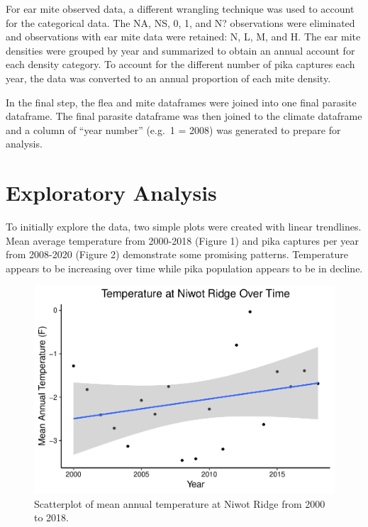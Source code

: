 \documentclass[
  12pt,
]{article}
\begin{document}
For ear mite observed data, a different wrangling technique was used to
account for the categorical data. The NA, NS, 0, 1, and N? observations
were eliminated and observations with ear mite data were retained: N, L,
M, and H. The ear mite densities were grouped by year and summarized to
obtain an annual account for each density category. To account for the
different number of pika captures each year, the data was converted to
an annual proportion of each mite density.

In the final step, the flea and mite dataframes were joined into one
final parasite dataframe. The final parasite dataframe was then joined
to the climate dataframe and a column of ``year number'' (e.g.~1 = 2008)
was generated to prepare for analysis.

\newpage

\hypertarget{exploratory-analysis}{%
\section{Exploratory Analysis}\label{exploratory-analysis}}

To initially explore the data, two simple plots were created with linear
trendlines. Mean average temperature from 2000-2018 (Figure 1) and pika
captures per year from 2008-2020 (Figure 2) demonstrate some promising
patterns. Temperature appears to be increasing over time while pika
population appears to be in decline.

\begin{figure}
\centering
\includegraphics{FreedmanDye_ENV872_Project_files/figure-latex/unnamed-chunk-2-1.pdf}
\caption{Scatterplot of mean annual temperature at Niwot Ridge from 2000
to 2018.}
\end{figure}
\end{document}
